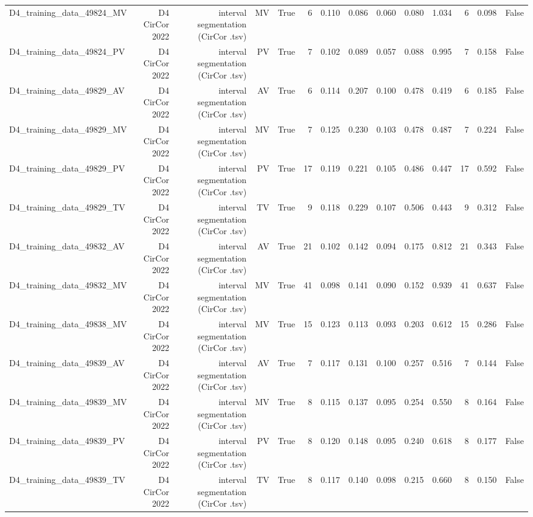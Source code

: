 \begin{table}[htbp]
\begin{tabular}{lrrrrrrrrrrrrr}
    D4\_training\_data\_49824\_MV & D4 CirCor 2022 & interval segmentation (CirCor .tsv) & MV & True & 6 & 0.110 & 0.086 & 0.060 & 0.080 & 1.034 & 6 & 0.098 & False \\
    D4\_training\_data\_49824\_PV & D4 CirCor 2022 & interval segmentation (CirCor .tsv) & PV & True & 7 & 0.102 & 0.089 & 0.057 & 0.088 & 0.995 & 7 & 0.158 & False \\
    D4\_training\_data\_49829\_AV & D4 CirCor 2022 & interval segmentation (CirCor .tsv) & AV & True & 6 & 0.114 & 0.207 & 0.100 & 0.478 & 0.419 & 6 & 0.185 & False \\
    D4\_training\_data\_49829\_MV & D4 CirCor 2022 & interval segmentation (CirCor .tsv) & MV & True & 7 & 0.125 & 0.230 & 0.103 & 0.478 & 0.487 & 7 & 0.224 & False \\
    D4\_training\_data\_49829\_PV & D4 CirCor 2022 & interval segmentation (CirCor .tsv) & PV & True & 17 & 0.119 & 0.221 & 0.105 & 0.486 & 0.447 & 17 & 0.592 & False \\
    D4\_training\_data\_49829\_TV & D4 CirCor 2022 & interval segmentation (CirCor .tsv) & TV & True & 9 & 0.118 & 0.229 & 0.107 & 0.506 & 0.443 & 9 & 0.312 & False \\
    D4\_training\_data\_49832\_AV & D4 CirCor 2022 & interval segmentation (CirCor .tsv) & AV & True & 21 & 0.102 & 0.142 & 0.094 & 0.175 & 0.812 & 21 & 0.343 & False \\
    D4\_training\_data\_49832\_MV & D4 CirCor 2022 & interval segmentation (CirCor .tsv) & MV & True & 41 & 0.098 & 0.141 & 0.090 & 0.152 & 0.939 & 41 & 0.637 & False \\
    D4\_training\_data\_49838\_MV & D4 CirCor 2022 & interval segmentation (CirCor .tsv) & MV & True & 15 & 0.123 & 0.113 & 0.093 & 0.203 & 0.612 & 15 & 0.286 & False \\
    D4\_training\_data\_49839\_AV & D4 CirCor 2022 & interval segmentation (CirCor .tsv) & AV & True & 7 & 0.117 & 0.131 & 0.100 & 0.257 & 0.516 & 7 & 0.144 & False \\
    D4\_training\_data\_49839\_MV & D4 CirCor 2022 & interval segmentation (CirCor .tsv) & MV & True & 8 & 0.115 & 0.137 & 0.095 & 0.254 & 0.550 & 8 & 0.164 & False \\
    D4\_training\_data\_49839\_PV & D4 CirCor 2022 & interval segmentation (CirCor .tsv) & PV & True & 8 & 0.120 & 0.148 & 0.095 & 0.240 & 0.618 & 8 & 0.177 & False \\
    D4\_training\_data\_49839\_TV & D4 CirCor 2022 & interval segmentation (CirCor .tsv) & TV & True & 8 & 0.117 & 0.140 & 0.098 & 0.215 & 0.660 & 8 & 0.150 & False \\

\end{tabular}
\end{table}
